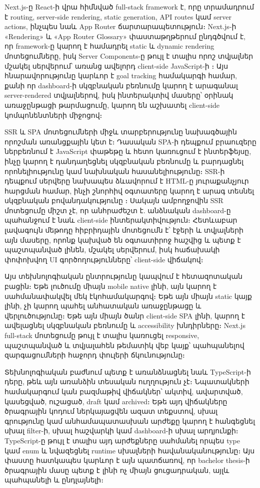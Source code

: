 Next.js-ը React-ի վրա հիմնված full-stack framework է, որը տրամադրում է routing, server-side rendering, static generation, API routes կամ server actions, ինչպես նաև App Router ճարտարապետություն։ Next.js-ի «Rendering» և «App Router Glossary» փաստաթղթերում ընդգծվում է, որ framework-ը կարող է համադրել static և dynamic rendering մոտեցումները, իսկ Server Components-ը թույլ է տալիս որոշ տվյալներ մշակել սերվերում՝ առանց ավելորդ client-side JavaScript-ի \autocite{nextDocsRendering,nextDocsAppGlossary}։ Այս հնարավորությունը կարևոր է goal tracking համակարգի համար, քանի որ dashboard-ի սկզբնական բեռնումը կարող է արագանալ server-rendered տվյալներով, իսկ ինտերակտիվ մասերը՝ օրինակ առաջընթացի թարմացումը, կարող են աշխատել client-side կոմպոնենտների միջոցով։

SSR և SPA մոտեցումների միջև տարբերությունը նախագծային որոշման առանցքային կետ է։ Դասական SPA-ի դեպքում բրաուզերը ներբեռնում է JavaScript փաթեթը և հետո կառուցում է ինտերֆեյսը, ինչը կարող է դանդաղեցնել սկզբնական բեռնումը և բարդացնել որոնելիությունը կամ նախնական հասանելիությունը։ SSR-ի դեպքում սերվերը նախապես ձևավորում է HTML-ը յուրաքանչյուր հարցման համար, ինչի շնորհիվ օգտատերը կարող է արագ տեսնել սկզբնական բովանդակությունը \autocite{nextDocsRendering}։ Սակայն ամբողջովին SSR մոտեցումը միշտ չէ, որ անհրաժեշտ է. անձնական dashboard-ը պահանջում է նաև client-side ինտերակտիվություն։ Հետևաբար լավագույն մեթոդը հիբրիդային մոտեցումն է՝ էջերի և տվյալների այն մասերը, որոնք կախված են օգտատիրոջ հաշվից և պետք է պաշտպանված լինեն, մշակել սերվերում, իսկ հաճախակի փոփոխվող UI գործողությունները՝ client-side վիճակով։

Այս տեխնոլոգիական ընտրությունը կապվում է հետազոտական բացին։ Եթե լուծումը միայն mobile native լինի, այն կարող է սահմանափակվել մեկ էկոհամակարգով։ Եթե այն միայն static կայք լինի, չի կարող պահել անհատական առաջընթացը և վերլուծությունը։ Եթե այն միայն ծանր client-side SPA լինի, կարող է ավելացնել սկզբնական բեռնումը և accessibility խնդիրները։ Next.js full-stack մոտեցումը թույլ է տալիս կառուցել responsive, պաշտպանված և տվյալահեն թեմատիկ վեբ կայք՝ պահպանելով զարգացումների հաջորդ փուլերի ճկունությունը։

Տեխնոլոգիական բաժնում պետք է առանձնացնել նաև TypeScript-ի դերը, թեև այն առանձին տեսական ուղղություն չէ։ Նպատակների համակարգում կան բազմաթիվ վիճակներ՝ ակտիվ, ավարտված, կասեցված, ուշացած, draft կամ archived։ Եթե այդ վիճակները ծրագրային կոդում ներկայացվեն ազատ տեքստով, սխալ գրությունը կամ անհամապատասխան արժեքը կարող է հանգեցնել սխալ filter-ի, սխալ հաշվարկի կամ dashboard-ի սխալ արդյունքի։ TypeScript-ը թույլ է տալիս այդ արժեքները սահմանել որպես type կամ enum և նվազեցնել runtime սխալների հավանականությունը։ Այս փաստը հատկապես կարևոր է այն պատճառով, որ bachelor thesis-ի ծրագրային մասը պետք է լինի ոչ միայն ցուցադրական, այլև պահպանելի և ընդլայնելի։

